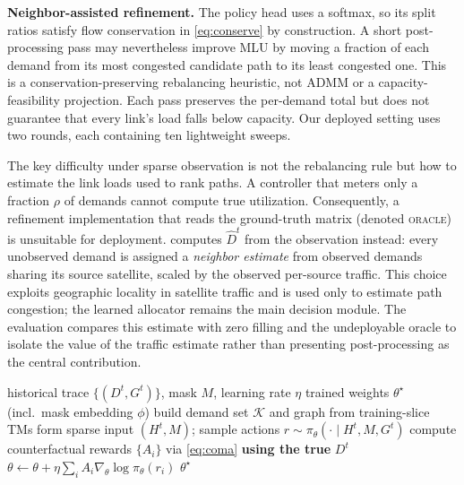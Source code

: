 \textbf{Neighbor-assisted refinement.} The policy head uses a softmax,
so its split ratios satisfy flow conservation in \cref{eq:conserve} by
construction. A short post-processing pass may nevertheless improve MLU by
moving a fraction of each demand from its most congested candidate path to
its least congested one. This is a conservation-preserving rebalancing
heuristic, not ADMM or a capacity-feasibility projection. Each pass preserves
the per-demand total but does not guarantee that every link's load falls
below capacity. Our deployed setting uses two rounds, each containing ten
lightweight sweeps.

The key difficulty under sparse observation is not the rebalancing rule but
how to estimate the link loads used to rank paths. A controller that meters
only a fraction $\rho$ of demands cannot compute true utilization.
Consequently, a refinement implementation that reads the ground-truth
matrix (denoted \textsc{oracle}) is unsuitable for deployment. \sysname{}
computes $\hat{D}^t$ from the observation instead: every unobserved demand
is assigned a \emph{neighbor estimate} from observed demands sharing its
source satellite, scaled by the observed per-source traffic. This choice
exploits geographic locality in satellite traffic and is used only to
estimate path congestion; the learned allocator remains the main decision
module. The evaluation compares this estimate with zero filling and the
undeployable oracle to isolate the value of the traffic estimate rather
than presenting post-processing as the central contribution.

\begin{algorithm}[t]
\caption{Offline training of \sysname{}}
\label{alg:train}
\begin{algorithmic}[1]
\Require historical trace $\{(D^t, G^t)\}$, mask $M$, learning rate $\eta$
\Ensure trained weights $\theta^\star$ (incl.\ mask embedding $\phi$)
\State build demand set $\mathcal{K}$ and graph from training-slice TMs
        \State form sparse input $(H^t, M)$;
            sample actions $r \sim \pi_\theta(\cdot \mid H^t, M, G^t)$
        \State compute counterfactual rewards $\{A_i\}$
            via \cref{eq:coma} \textbf{using the true} $D^t$
        \State $\theta \gets \theta + \eta \sum_i A_i
            \nabla_\theta \log \pi_\theta(r_i)$
    \EndFor
\EndFor
\State \Return $\theta^\star$
\end{algorithmic}
\end{algorithm}

